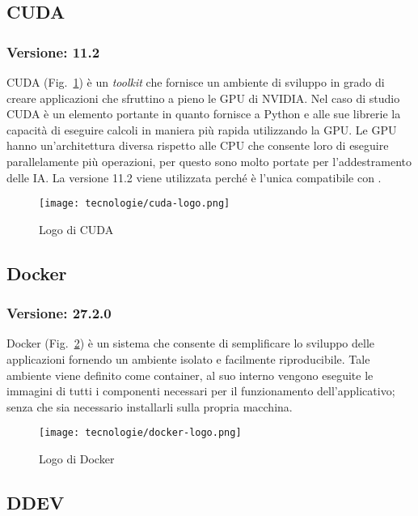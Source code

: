 \newpage

\subsection{\label{tec:cuda}CUDA}
\subsubsection{Versione: 11.2}
CUDA (Fig.~\ref{fig:logo-cuda}) è un \emph{toolkit} che fornisce un ambiente di sviluppo in grado di creare applicazioni che sfruttino a pieno le GPU di NVIDIA.
Nel caso di studio CUDA è un elemento portante in quanto fornisce a Python e alle sue librerie la capacità di eseguire calcoli in maniera più rapida utilizzando la GPU.
Le GPU hanno un'architettura diversa rispetto alle CPU che consente loro di eseguire parallelamente più operazioni, per questo sono molto portate per l'addestramento delle IA.
La versione 11.2 viene utilizzata perché è l'unica compatibile con .

\begin{figure}[!h] 
  \centering 
  \texttt{[image: tecnologie/cuda-logo.png]} 
  \caption{Logo di CUDA}
  \label{fig:logo-cuda}
\end{figure}


\subsection{\label{tec:docker}Docker}
\subsubsection{Versione: 27.2.0}
Docker (Fig.~\ref{fig:logo-docker}) è un sistema che consente di semplificare lo sviluppo delle applicazioni fornendo un ambiente isolato e facilmente riproducibile. Tale ambiente viene definito come container, al suo interno vengono eseguite le immagini di tutti i componenti necessari per il funzionamento dell'applicativo; senza che sia necessario installarli sulla propria macchina.

\begin{figure}[!h] 
  \centering 
  \texttt{[image: tecnologie/docker-logo.png]} 
  \caption{Logo di Docker}
  \label{fig:logo-docker}
\end{figure}


\subsection{\label{tec:ddev}DDEV}
